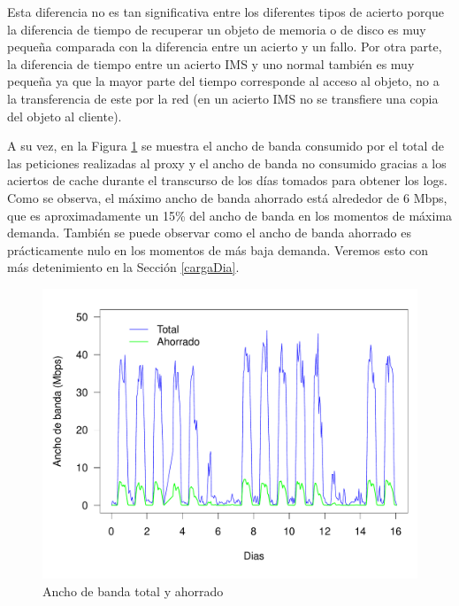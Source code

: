 \documentclass[twocolumn]{Jornadas}
\begin{document}
Esta diferencia no es tan significativa entre los diferentes tipos de acierto porque la diferencia de tiempo de recuperar un objeto de memoria o de disco es muy pequeña comparada con la diferencia entre un acierto y un fallo. Por otra parte, la diferencia de tiempo entre un acierto IMS y uno normal también es muy pequeña ya que la mayor parte del tiempo corresponde al acceso al objeto, no a la transferencia de este por la red (en un acierto IMS no se transfiere una copia del objeto al cliente).

A su vez, en la Figura \ref{fig:ahorrado} se muestra el ancho de banda consumido por el total de las peticiones realizadas al proxy y el ancho de banda no consumido gracias a los aciertos de cache durante el transcurso de los días tomados para obtener los logs. Como se observa, el máximo ancho de banda ahorrado está alrededor de 6 Mbps, que es aproximadamente un 15\% del ancho de banda en los momentos de máxima demanda. También se puede observar como el ancho de banda ahorrado es prácticamente nulo en los momentos de más baja demanda. Veremos esto con más detenimiento en la Sección \ref{cargaDia}.

\begin{figure}[ht!]
\includegraphics[scale=0.29]{figures/Bandwidth_full.pdf}
\caption{Ancho de banda total y ahorrado}
\label{fig:ahorrado}
\end{figure}
\end{document}
